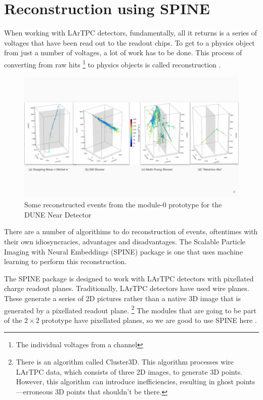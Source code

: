 \section{Reconstruction using SPINE}

When working with LArTPC detectors, fundamentally, all it returns is a series of voltages that have been read out to the  readout chips.
To get to a physics object from just a number of  voltages, a lot of work has to be done.
This process of converting from raw hits
\footnote{The individual voltages from a channel}
to physics objects is called reconstruction \cite{Dominé_deSoux_Drielsma_Koh_Itay_Lin_Terao_Tsang_Usher_2021}.

\begin{figure}[H]
  \centering
  \includegraphics[width=120mm]{figures/mod0Events.png}
  \caption{Some reconstructed events from the module-0 prototype for the DUNE Near Detector}
  \label{mod0Event}
\end{figure}

There are a number of algorithims to do reconstruction of events, oftentimes with their own idiosyncracies, advantages and disadvantages.
The  Scalable Particle Imaging with Neural Embeddings (SPINE) package is one that uses machine learning to perform this reconstruction.

The SPINE  package is designed to work with LArTPC detectors with pixellated charge readout planes.
Traditionally, LArTPC detectors have used wire planes.
These generate a series of 2D pictures rather than  a native 3D image that is generated by a pixellated readout plane.
\footnote{There is an algorithm called  Cluster3D.
  This algorithm processes wire LArTPC data, which consists of three 2D images, to generate 3D points.
  However, this algorithm can introduce inefficiencies, resulting in ghost points—erroneous 3D points that shouldn't be there.}
The modules that are going to be part of the $2 \times 2$  prototype have pixellated planes, so we are good to use SPINE here \cite{drielsma2020clusteringelectromagneticshowersparticle}.

